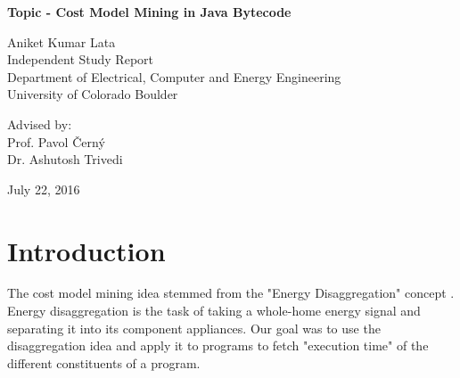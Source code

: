 \documentclass[11pt]{article}
\begin{document}
\vfill
\vfill

{\Large\bf{
Topic - Cost Model Mining in Java Bytecode}}


\vfill
\vfill
\vfill
\vfill

{\Large{Aniket Kumar Lata}}\newline
\\{\Large{Independent Study Report}}\newline
\\{\Large{Department of Electrical, Computer and Energy Engineering}}\newline
\\{\Large{University of Colorado Boulder}} \newline

\vfill
{\Large{Advised by:}}\newline
\\{\Large{Prof. Pavol {\v C}ern\'y }}\newline
\\{\Large{Dr. Ashutosh Trivedi}}\newline
\vfill
\vfill

July 22, 2016

\vfill
\vfill

\newpage
\tableofcontents
\newpage

\section{Introduction}
The cost model mining idea stemmed from the "Energy Disaggregation" concept . Energy disaggregation is the task of taking a whole-home energy signal and separating it into its component appliances. Our goal was to use the disaggregation idea and apply it to programs to fetch "execution time" of the different constituents of a program.\citep{energydisag}
\end{document}
